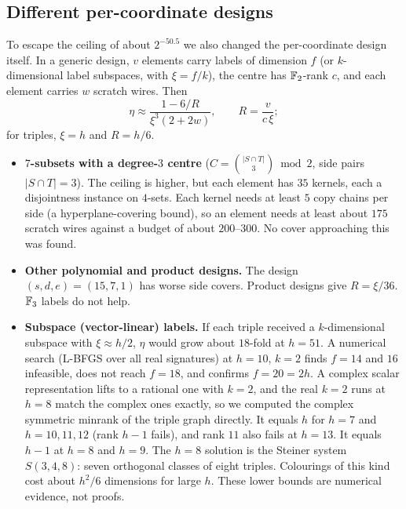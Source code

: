 \subsection{Different per-coordinate designs}
To escape the ceiling of about $2^{-50.5}$ we also changed the per-coordinate design itself. In a generic design, $v$ elements carry labels of dimension $f$ (or $k$-dimensional label subspaces, with $\xi = f/k$), the centre has $\mathbb{F}_2$-rank $c$, and each element carries $w$ scratch wires. Then
\[
\eta \approx \frac{1-6/R}{\xi^3(2+2w)}, \qquad R = \frac{v}{c\,\xi};
\]
for triples, $\xi = h$ and $R = h/6$.
\begin{itemize}[leftmargin=*]
\item \textbf{$7$-subsets with a degree-$3$ centre} ($C = \binom{|S\cap T|}{3}\bmod 2$, side pairs $|S\cap T| = 3$). The ceiling is higher, but each element has $35$ kernels, each a disjointness instance on $4$-sets. Each kernel needs at least $5$ copy chains per side (a hyperplane-covering bound), so an element needs at least about $175$ scratch wires against a budget of about $200$--$300$. No cover approaching this was found.
\item \textbf{Other polynomial and product designs.} The design $(s,d,e) = (15,7,1)$ has worse side covers. Product designs give $R = \xi/36$. $\mathbb{F}_3$ labels do not help.
\item \textbf{Subspace (vector-linear) labels.} If each triple received a $k$-dimensional subspace with $\xi\approx h/2$, $\eta$ would grow about $18$-fold at $h = 51$. A numerical search (L-BFGS over all real signatures) at $h = 10$, $k = 2$ finds $f = 14$ and $16$ infeasible, does not reach $f = 18$, and confirms $f = 20 = 2h$. A complex scalar representation lifts to a rational one with $k = 2$, and the real $k=2$ runs at $h = 8$ match the complex ones exactly, so we computed the complex symmetric minrank of the triple graph directly. It equals $h$ for $h = 7$ and $h = 10, 11, 12$ (rank $h-1$ fails), and rank $11$ also fails at $h = 13$. It equals $h-1$ at $h = 8$ and $h = 9$. The $h = 8$ solution is the Steiner system $S(3,4,8)$: seven orthogonal classes of eight triples. Colourings of this kind cost about $h^2/6$ dimensions for large $h$. These lower bounds are numerical evidence, not proofs.
\end{itemize}
